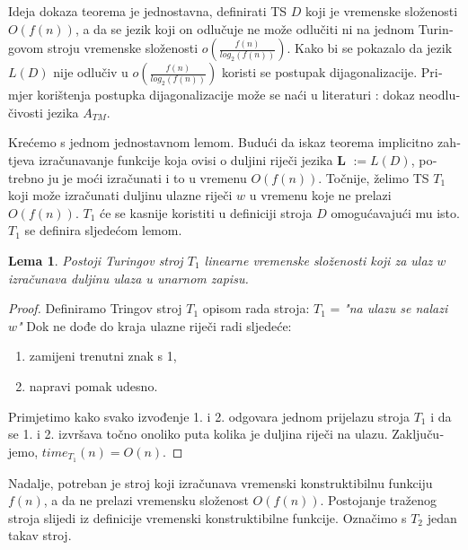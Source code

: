 \documentclass[12pt]{rectors}
\newtheorem{lemma}[theorem]{Lema}
\begin{document}
\begin{otherlanguage}{croatian}
Ideja dokaza teorema je jednostavna, definirati TS $D$ koji je vremenske složenosti
$O(f(n))$, a da se jezik koji on odlučuje ne može odlučiti ni na jednom Turingovom stroju
vremenske složenosti $o( \frac {f\left ( n \right )}{log_2\left ( f\left ( n \right ) \right )})$. Kako bi se pokazalo da jezik $L(D)$ nije odlučiv u $o( \frac {f\left ( n \right )}{log_2\left ( f\left ( n \right ) \right )})$ koristi se postupak dijagonalizacije.
Primjer korištenja postupka dijagonalizacije može se naći u literaturi
{\cite{sipser2006}}: dokaz neodlučivosti jezika $A_{TM}$.
\vspace{2cm}

Krećemo s jednom jednostavnom lemom. \newline
Budući da iskaz teorema implicitno zahtjeva izračunavanje funkcije koja ovisi o duljini riječi jezika \textbf{L} $:= L(D)$, potrebno ju je moći izračunati i to u vremenu $O \left ( f(n) \right )$.
Točnije, želimo TS $T_1$ koji može izračunati duljinu ulazne riječi $w$ u vremenu koje ne prelazi $O(f(n))$. $T_1$ će se kasnije koristiti u definiciji stroja $D$ omogućavajući mu isto.
 \newline
$T_1$ se definira sljedećom lemom.
\begin{lemma}\label{lemma:t1}
Postoji Turingov stroj $T_1$ linearne vremenske složenosti koji za ulaz $w$ izračunava  duljinu ulaza u unarnom zapisu.
\end{lemma}
\begin{proof}
Definiramo Tringov stroj $T_1$ opisom rada stroja:\newline
$T_1$ = \textit{"na ulazu se nalazi $w$"}\newline
Dok ne dođe do kraja ulazne riječi radi sljedeće:
\begin{enumerate}
    \item zamijeni trenutni znak s 1,
    \item napravi pomak udesno.
\end{enumerate}
Primjetimo kako svako izvođenje 1. i 2. odgovara jednom prijelazu stroja $T_1$ i da
se 1. i 2. izvršava točno onoliko puta kolika je duljina riječi na ulazu.
Zaključujemo, $time_{T_1}(n) = O(n)$.
\end{proof}

Nadalje, potreban je stroj koji izračunava vremenski konstruktibilnu funkciju $f(n)$, 
a da ne prelazi vremensku složenost $O(f(n))$.
Postojanje traženog stroja slijedi iz definicije vremenski konstruktibilne funkcije.
Označimo s $T_2$ jedan takav stroj.


\end{otherlanguage}
\end{document}
